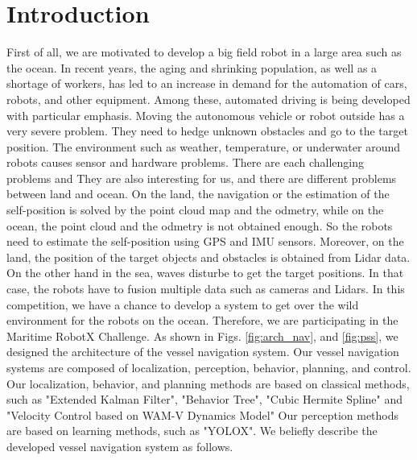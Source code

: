 \documentclass[lettersize,journal]{IEEEtran}
\begin{document}
\section{Introduction}
First of all, we are motivated to develop a big field robot in a large area such as the ocean.
In recent years, the aging and shrinking population, as well as a shortage of workers,
has led to an increase in demand for the automation of cars, robots, and other equipment.
Among these, automated driving is being developed with particular emphasis.
Moving the autonomous vehicle or robot outside has a very severe problem.
They need to hedge unknown obstacles and go to the target position.
The environment such as weather, temperature, or underwater around robots causes sensor and hardware problems.
There are each challenging problems and They are also interesting for us, and there are different problems between land and ocean.
On the land, the navigation or the estimation of the self-position is solved by the point cloud map and the odmetry,
while on the ocean, the point cloud and the odmetry is not obtained enough. So the robots need to estimate the self-position using GPS and IMU sensors.
Moreover, on the land, the position of the target objects and obstacles is obtained from Lidar data. On the other hand in the sea,
waves disturbe to get the target positions. In that case, the robots have to fusion multiple data such as cameras and Lidars.
In this competition, we have a chance to develop a system to get over the wild environment 
for the robots on the ocean. Therefore, we are participating in the Maritime RobotX Challenge.
As shown in  Figs. \ref{fig:arch_nav}, and \ref{fig:pss},
we designed the architecture of the vessel navigation system. 
Our vessel navigation systems are composed of localization, perception, behavior, planning, and control.
Our localization, behavior, and planning methods are based on classical methods,
such as "Extended Kalman Filter", "Behavior Tree", "Cubic Hermite Spline" and "Velocity Control based on WAM-V Dynamics Model"
Our perception methods are based on learning methods, such as "YOLOX".
We beliefly describe the developed vessel navigation system as follows.
\end{document}
